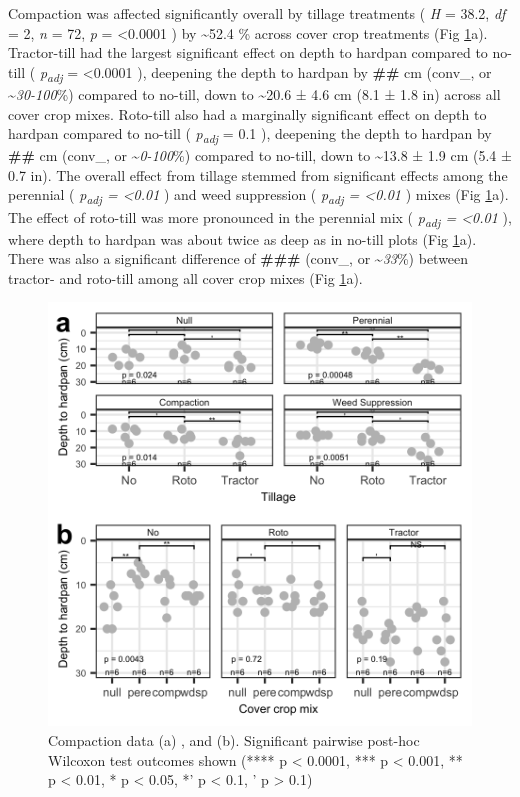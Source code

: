\documentclass[
  12pt,
]{article}
\begin{document}
Compaction was affected significantly overall by tillage treatments (
\emph{H} = 38.2,
\emph{df} = 2,
\emph{n} = 72,
\emph{p} = \textless0.0001
) by
\textasciitilde52.4 \%
across cover crop treatments (Fig \ref{fig:compactFig}a).
Tractor-till had the largest significant effect on depth to hardpan compared to no-till (
\emph{p\textsubscript{adj}} = \textless0.0001
),
deepening the depth to hardpan by \textbf{\#\#} cm (conv\_, or \textasciitilde{}\emph{30-100}\%) compared to no-till,
down to
\textasciitilde20.6 ±
4.6 cm
(8.1 ±
1.8 in)
across all cover crop mixes.
Roto-till also had a marginally significant effect on depth to hardpan compared to no-till (
\emph{p\textsubscript{adj}} = 0.1
),
deepening the depth to hardpan by \textbf{\#\#} cm (conv\_, or \textasciitilde{}\emph{0-100}\%) compared to no-till, down to
\textasciitilde13.8 ±
1.9 cm
(5.4 ±
0.7 in).
The overall effect from tillage stemmed from significant effects among the perennial (
\emph{p\textsubscript{adj} = \textless0.01}
) and weed suppression (
\emph{p\textsubscript{adj} = \textless0.01}
) mixes (Fig \ref{fig:compactFig}a).
The effect of roto-till was more pronounced in the perennial mix (
\emph{p\textsubscript{adj} = \textless0.01}
), where depth to hardpan was about twice as deep as in no-till plots (Fig \ref{fig:compactFig}a).
There was also a significant difference of \textbf{\#\#\#} (conv\_, or \textasciitilde{}\emph{33}\%) between tractor- and roto-till among all cover crop mixes (Fig \ref{fig:compactFig}a).

\begin{figure}
\includegraphics[width=12.5in]{../figs/compactionPlot} \caption{Compaction data (a) , and (b). Significant pairwise post-hoc Wilcoxon test outcomes shown (**** p < 0.0001, *** p < 0.001, ** p < 0.01, * p < 0.05, *' p < 0.1, ' p > 0.1)}\label{fig:compactFig}
\end{figure}
\end{document}
